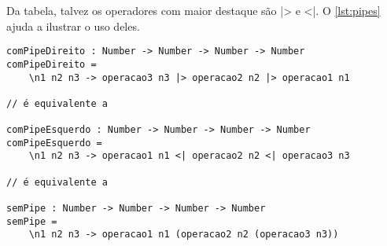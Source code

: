 Da tabela, talvez os operadores com maior destaque são |> e <|. O \autoref{lst:pipes}
ajuda a ilustrar o uso deles.

\begin{lstlisting}[label={lst:pipes},caption={Exemplos de uso dos operadores de pipe}]
comPipeDireito : Number -> Number -> Number -> Number
comPipeDireito =
    \n1 n2 n3 -> operacao3 n3 |> operacao2 n2 |> operacao1 n1

// é equivalente a

comPipeEsquerdo : Number -> Number -> Number -> Number
comPipeEsquerdo =
    \n1 n2 n3 -> operacao1 n1 <| operacao2 n2 <| operacao3 n3

// é equivalente a

semPipe : Number -> Number -> Number -> Number
semPipe =
    \n1 n2 n3 -> operacao1 n1 (operacao2 n2 (operacao3 n3))
\end{lstlisting}

